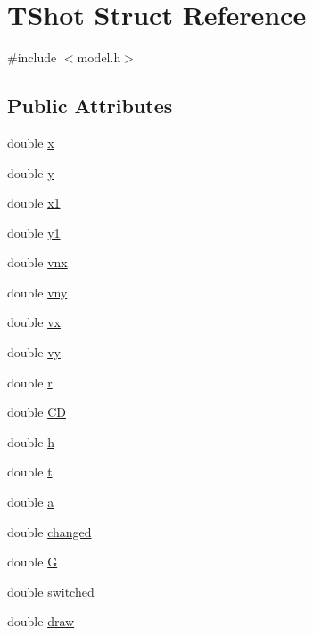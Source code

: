 \hypertarget{struct_t_shot}{}\section{T\+Shot Struct Reference}
\label{struct_t_shot}


{\ttfamily \#include $<$model.\+h$>$}

\subsection*{Public Attributes}
\begin{DoxyCompactItemize}
\item 
double \hyperlink{struct_t_shot_a20e267b4a3e1f0feca9ff50c6c8dd460}{x}
\item 
double \hyperlink{struct_t_shot_a04381372a3ffa1796de43381ab1409f6}{y}
\item 
double \hyperlink{struct_t_shot_a04c0ba5caa1ea9ab2be4f282d44423bb}{x1}
\item 
double \hyperlink{struct_t_shot_ad00c30f4c3b310313614c3f9690ff3af}{y1}
\item 
double \hyperlink{struct_t_shot_ae4ea609121b150dcf98e1a32337d82aa}{vnx}
\item 
double \hyperlink{struct_t_shot_a169ab83d9080694ea052b912f257e1df}{vny}
\item 
double \hyperlink{struct_t_shot_add4d9845cee9082a489e2aae73a20891}{vx}
\item 
double \hyperlink{struct_t_shot_a3ad1d2834c4be13bcdf488ef57de8311}{vy}
\item 
double \hyperlink{struct_t_shot_aa69b952f8f184fec8e1e394e2de3448d}{r}
\item 
double \hyperlink{struct_t_shot_a0b8bd704b499d9e24249e5c35e526fc4}{CD}
\item 
double \hyperlink{struct_t_shot_a78e053ce9c33e588e8c6220c19163f77}{h}
\item 
double \hyperlink{struct_t_shot_a59b926a3fb4948c0b3d18fb0c480b794}{t}
\item 
double \hyperlink{struct_t_shot_a15a6a1f4d0e4fa8d2922746d3718c645}{a}
\item 
double \hyperlink{struct_t_shot_ac06afbb79a97feeef328bd6e985105ae}{changed}
\item 
double \hyperlink{struct_t_shot_aca3a4d1732cb311375e514137d8ddae2}{G}
\item 
double \hyperlink{struct_t_shot_a5c967558fbed8590fe788a4d68323739}{switched}
\item 
double \hyperlink{struct_t_shot_aec72c87adc6f131dc80d154480edf585}{draw}
\end{DoxyCompactItemize}


